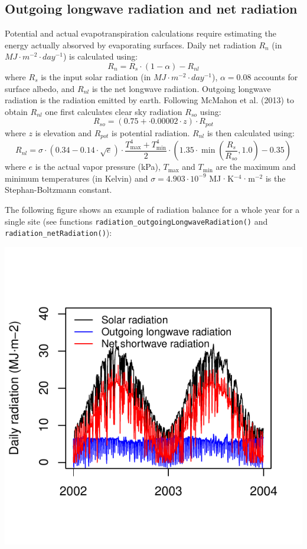 \documentclass[11pt,a4paper]{article}
\begin{document}
\subsection{Outgoing longwave radiation and net radiation}
Potential and actual evapotranspiration calculations require estimating the energy actually absorved by evaporating surfaces. Daily net radiation $R_n$ (in $MJ\cdot m^{-2}\cdot day^{-1}$) is calculated using:
\begin{equation}
R_n = R_s\cdot (1 - \alpha) - R_{nl}
\end{equation}
where $R_s$ is the input solar radiation (in $MJ\cdot m^{-2}\cdot day^{-1}$), $\alpha = 0.08$ accounts for surface albedo, and $R_{nl}$ is the net longwave radiation. Outgoing longwave radiation is the radiation emitted by earth. Following McMahon et al. (2013) to obtain $R_{nl}$ one first calculates clear sky radiation $R_{so}$ using:
\begin{equation}
  R_{so} = (0.75 + \cdot 0.00002 \cdot z) \cdot R_{pot}
\end{equation}
where $z$ is elevation and $R_{pot}$ is potential radiation. $R_{nl}$ is then calculated using:
\begin{equation}
R_{nl} = \sigma \cdot (0.34 - 0.14 \cdot \sqrt{e}) \cdot \frac{T_{\max}^4 + T_{\min}^4}{2} \cdot (1.35 \cdot \min(\frac{R_s}{R_{so}},1.0) - 0.35)
\end{equation}
where $e$ is the actual vapor pressure (kPa), $T_{\max}$ and $T_{\min}$ are the maximum and minimum temperatures (in Kelvin) and $\sigma = 4.903\cdot 10^{-9}$ MJ·K$^{-4}$·m$^{-2}$ is the Stephan-Boltzmann constant.

The following figure shows an example of radiation balance for a whole year for a single site (see functions \texttt{radiation\_outgoingLongwaveRadiation()} and \texttt{radiation\_netRadiation()}):
\begin{center}
\includegraphics{Meteorology-027}
\end{center}
\end{document}
